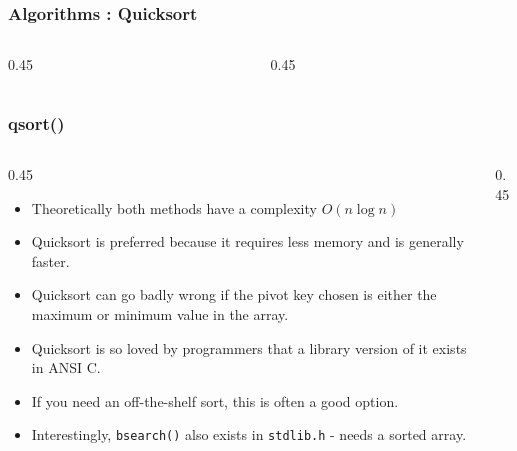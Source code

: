 
\begin{frame}[fragile]
\frametitle{Algorithms : Quicksort}
\begin{columns}[T]

\begin{column}{0.45\textwidth}

\end{column}

\pause
\begin{column}{0.45\textwidth}

\end{column}

\end{columns}
\end{frame}


\begin{frame}[fragile]
\frametitle{qsort()}
\begin{columns}[T]

\begin{column}{0.45\textwidth}
\begin{itemize}[<+->]
\item Theoretically both methods have a complexity $O(n \log n)$
\item Quicksort is preferred because it requires less memory and is generally faster.
\item Quicksort can go badly wrong if the pivot key chosen is either the maximum or minimum value in the array.
\item Quicksort is so loved by programmers that a library version of it exists in ANSI C.
\item If you need an off-the-shelf sort, this is often a good option.
\item Interestingly, \verb^bsearch()^ also exists in \verb^stdlib.h^ - needs a sorted array.
\end{itemize}
\end{column}

\pause
\begin{column}{0.45\textwidth}

\end{column}

\end{columns}
\end{frame}

